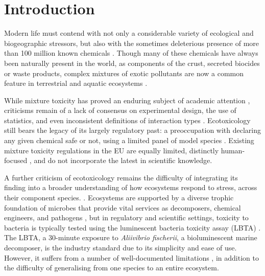 \documentclass[10pt]{article}
\begin{document}
\linenumbers

\section{Introduction}
\label{S:1}

Modern life must contend with not only a considerable variety of ecological and biogeographic stressors, but also with the sometimes deleterious presence of more than 100 million known chemicals \cite{CAS2015}. Though many of these chemicals have always been naturally present in the world, as components of the crust, secreted biocides or waste products, complex mixtures of exotic pollutants are now a common feature in terrestrial and aquatic ecosystems \cite{EuropeanCommission2012a}. 

While mixture toxicity has proved an enduring subject of academic attention \cite{Bliss1939}, criticisms remain of a lack of consensus on experimental design, the use of statistics, and even inconsistent definitions of interaction types \cite{Jackson2016,Piggott2015,Schafer2018}. Ecotoxicology still bears the legacy of its largely regulatory past: a preoccupation with declaring any given chemical safe or not, using a limited panel of model species \cite{OECD2014SectionSystems}. Existing mixture toxicity regulations in the EU are equally limited, distinctly human-focused \cite{EuropeanCommission2012a}, and do not incorporate the latest in scientific knowledge.

A further criticism of ecotoxicology remains the difficulty of integrating its finding into a broader understanding of how ecosystems respond to stress, across their component species. \cite{Chapman2002a,Gessner2016}. Ecosystems are supported by a diverse trophic foundation of microbes that provide vital services as decomposers, chemical engineers, and pathogens \cite{Nannipieri2003a,VanderHeijden2008a}, but in regulatory and scientific settings, toxicity to bacteria is typically tested using the luminescent bacteria toxicity assay (LBTA) \cite{OECD2014SectionSystems}. The LBTA, a 30-minute exposure to \textit{Aliivibrio fischerii}, a bioluminescent marine decomposer, is the industry standard due to its simplicity and ease of use. However, it suffers from a number of well-documented limitations \cite{Ma2014}, in addition to the difficulty of generalising from one species to an entire ecosystem.
\end{document}
